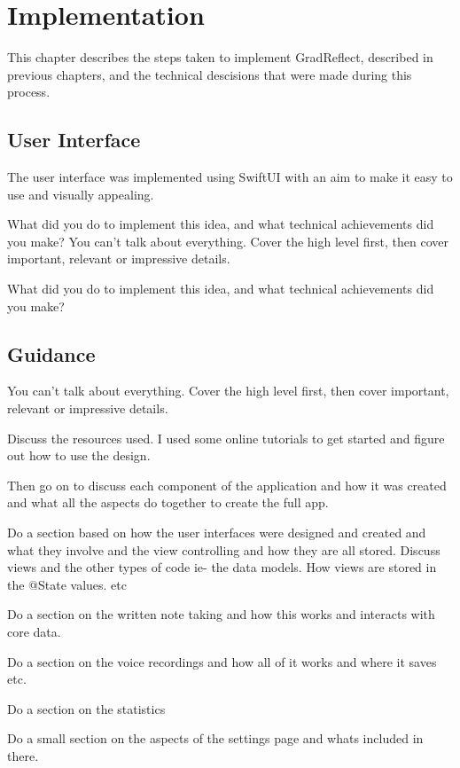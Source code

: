 \documentclass{l4proj}
\begin{document}
\chapter{Implementation} \label{implementation}

This chapter describes the steps taken to implement GradReflect, described in previous chapters, and the technical descisions that were made during this process.

\section{User Interface}

The user interface was implemented using SwiftUI with an aim to make it easy to use and visually appealing.

What did you do to implement this idea, and what technical achievements did you make?
You can't talk about everything. Cover the high level first, then cover important, relevant or impressive details.

What did you do to implement this idea, and what technical achievements did you make?
\section{Guidance}
You can't talk about everything. Cover the high level first, then cover important, relevant or impressive details.

\par 
Discuss the resources used. I used some online tutorials to get started and figure out how to use the design.
\par 
Then go on to discuss each component of the application and how it was created and what all the aspects do
together to create the full app. 
\par 
Do a section based on how the user interfaces were designed and created and what they involve and the view 
controlling and how they are all stored. Discuss views and the other types of code ie- the data models. How 
views are stored in the @State values. etc 
\par 
Do a section on the written note taking and how this works and interacts with core data.
\par 
Do a section on the voice recordings and how all of it works and where it saves etc.
\par 
Do a section on the statistics 
\par 
Do a small section on the aspects of the settings page and whats included in there.
\end{document}
